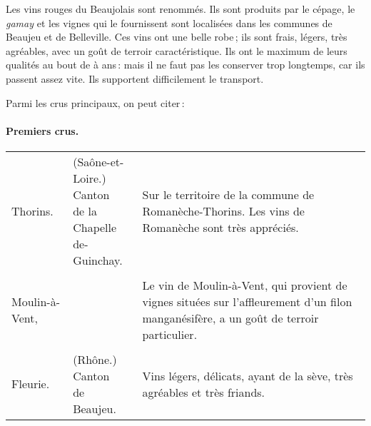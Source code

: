 Les vins rouges du Beaujolais sont renommés. Ils sont produits par le cépage,
le \textit{gamay} et les vignes qui le fournissent sont localisées dans les
communes de Beaujeu et de Belleville. Ces vins ont une belle robe ; ils sont
frais, légers, très agréables, avec un goût de terroir caractéristique. Ils ont
le maximum de leurs qualités au bout de {\mmm} à {\mmm} ans : mais il
ne faut pas les conserver trop longtemps, car ils passent assez vite. Ils
supportent difficilement le transport.

\medskip
Parmi les crus principaux, on peut citer :

\paragraph{Premiers crus.}

\scriptsize
\begin{longtable}{m{12em}m{9em}m{13em}}                                                    
  Thorins.             & \makecell{(Saône-et-Loire.) 
                         \\ Canton  
                         \\ de la Chapelle 
                         \\ de-Guinchay.}             & Sur le territoire de la commune de Romanèche-Thorins. 
                                                        Les vins de Romanèche sont très appréciés.                     \\
                       &                              &                                                                \\
  Moulin-à-Vent,       & \makecell{—}                 & Le vin de Moulin-à-Vent, qui provient de vignes situées 
                                                        sur l'affleurement d'un filon manganésifère, a un goût 
                                                        de terroir particulier.                                        \\
                       &                              &                                                                \\
  Fleurie.             & \makecell{(Rhône.)                                       
                         \\ Canton                  
                         \\ de Beaujeu.}              & Vins légers, délicats, ayant de la sève, très agréables 
                                                        et très friands.                                               \\
\end{longtable}                                                                                             
\normalsize


